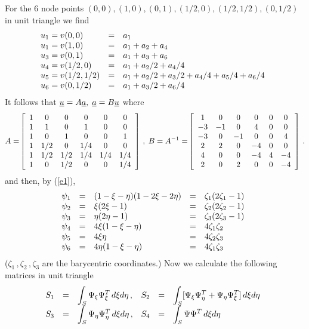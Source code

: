 \documentclass[12pt,a4paper,USenglish,twoside]{book}
\begin{document}
For the 6 node points $(0,0), (1,0), (0,1), (1/2,0), (1/2,1/2), (0,1/2)$
in unit triangle we find
\[
\ba{.}{lll}
u_1 = v(0,0) &=& a_1\\
u_1 = v(1,0) &=& a_1 + a_2 + a_4\\
u_3 = v(0,1) &=& a_1 + a_3 + a_6\\
u_4 = v(1/2,0) &=& a_1 + a_2/2 + a_4/4\\
u_5 = v(1/2,1/2) &=& a_1 + a_2/2 + a_3/2 + a_4/4 + a_5/4 + a_6/4\\
u_6 = v(0,1/2) &=& a_1 + a_3/2 + a_6/4
\ea{.}
\]
It follows that $\u = A\a, \; \a = B\u$ where
   \[
A = \ \ba{[}{cccccc}
     1 &   0 &   0 &   0 &   0 &   0\\
     1 &   1 &   0 &   1 &   0 &   0\\
     1 &   0 &   1 &   0 &   0 &   1\\
     1 & 1/2 &   0 & 1/4 &   0 &   0\\
     1 & 1/2 & 1/2 & 1/4 & 1/4 & 1/4\\
     1 &   0 & 1/2 &   0 &   0 & 1/4 \ea{]}\,,\;
B = A^{-1} = \ \ba{[}{cccccc}
      1 &    0 &    0 &    0 &    0&     0\\
     -3 &   -1 &    0 &    4 &    0 &    0\\
     -3 &    0 &   -1 &    0 &    0 &    4\\
      2 &    2 &    0 &   -4 &    0 &    0\\
      4 &    0 &    0 &   -4 &    4 &   -4\\
      2 &    0 &    2 &    0 &    0 &   -4\ea{]}\,.
\]
and then, by (\ref{e1}),
\[
\ba{.}{rclcl}
\psi_1 &=& (1-\xi -\eta )(1-2\xi -2\eta )
&=& \zeta _1(2\zeta _1 - 1)\\
\psi_2 &=& \xi (2\xi   - 1) &=& \zeta _2(2\zeta _2 - 1)\\
\psi_3 &=& \eta (2\eta  - 1) &=& \zeta _3(2\zeta _3 - 1)\\
\psi_4 &=& 4\xi (1-\xi -\eta ) &=& 4\zeta _1\zeta _2\\
\psi_5 &=& 4\xi \eta  &=& 4\zeta _2\zeta _3\\
\psi_6 &=& 4\eta (1-\xi -\eta ) &=& 4\zeta _1\zeta _3
\ea{.}
\]
($\zeta_1\,, \zeta_2\,, \zeta_3$ are the barycentric coordinates.)
Now we calculate the following matrices in unit triangle
\[
\ba{.}{llllll}
S_1 &=& \dis \int_S\Psi_{\xi}\Psi_{\xi}^T\, d\xi d\eta\,, &
S_2 &=& \dis \int_S[\Psi_{\xi}\Psi_{\eta}^T + \Psi_{\eta}\Psi_{\xi}^T]\, d\xi d\eta\\
S_3 &=& \dis \int_S\Psi_{\eta}\Psi_{\eta}^T\, d\xi d\eta\,,  &
S_4 &=& \dis \int_S\Psi\Psi^T\, d\xi d\eta
\ea{.}
\]
\end{document}
